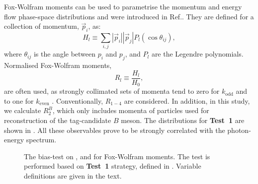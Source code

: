 Fox-Wolfram moments can be used to parametrise the momentum and energy flow phase-space distributions and were introduced in Ref.\cite{Fox:1978vu}.
They are defined for a collection of momentum, $\vec{p}_i$, as:
\begin{equation}
    H_l \equiv \sum_{i,j} |\vec{p}_i||\vec{p}_j|P_l(\cos\theta_{ij}),
\end{equation}
where $\theta_{ij}$ is the angle between $p_i$ and $p_j$, and $P_l$ are the Legendre polynomials.
Normalised Fox-Wolfram moments,
\begin{equation}
R_l\equiv \frac{H_l}{H_0},
\end{equation}
are often used, as strongly collimated sets of momenta tend to zero for $k_{\mathrm{odd}}$ and to one for $k_{\mathrm{even}}$ \cite{BaBar:2014omp}.
Conventionally, $R_{1-4}$ are considered.
In addition, in this study, we calculate $R_2^B$, which only includes momenta of particles used for reconstruction of the tag-candidate $B$ meson.
The distributions for \textbf{Test~1} are shown in .
All these observables prove to be strongly correlated with the photon-energy spectrum.

\begin{figure}[htbp!]
\end{figure}
\begin{figure}[htbp!]
    \ContinuedFloat
    \caption{\label{fig:fox_wolframs_test1} The bias-test on \EB, \Estar and \Mbc for Fox-Wolfram moments.
    The test is performed based on \textbf{Test~1} strategy, defined in .
    Variable definitions are given in the text.}
\end{figure}
